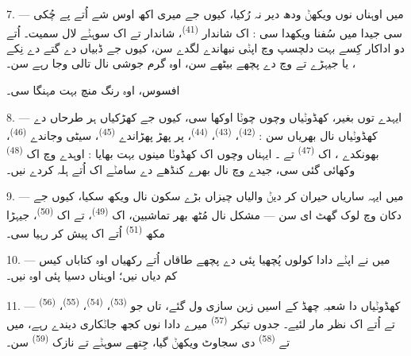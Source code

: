7. --- میں اوہناں نوں ویکھݨ ودھ دیر نہ رُکیا، کیوں جے میری اکھ اوس شے اُتے پے چُکی
سی جیدا میں سُفنا ویکھدا سی : اک شاندار 
\textsuperscript{(41)}، شاندار  تے اک سوہݨے لال  سمیت۔
 اُتے دو اداکار کِسے بہت دلچسپ  وچ اپݨی 
نبھاندے لگدے سن، کیوں جے ڈبیاں دے گتے دے نِکے ، یا جیہڑے
 تے  وچ  دے پچھے بیٹھے سن،
اوہ گرم جوشی نال تالی وجا رہے سن۔

افسوس، اوہ رنگ منچ بہت مہنگا سی۔

8. --- ایہدے توں بغیر، کھڈوݨیاں وچوں چوݨا اوکھا سی، کیوں جے کھڑکیاں ہر طرحاں دے
کھڈوݨیاں نال بھریاں سن :  \textsuperscript{(42)}،
 \textsuperscript{(43)}،  \textsuperscript{(44)}، پر
پھڑ پھڑاندے  \textsuperscript{(45)}، سیٹی وجاندے 
\textsuperscript{(46)}، بھونکدے ، اک 
\textsuperscript{(47)} تے ۔ ایہناں وچوں اک کھڈوݨا مینوں بہت بھایا :
اوہدے وچ اک  \textsuperscript{(48)} وکھائی گئی سی، جیدے وچ
 نال بھرے کنڈھے دے سامݨے  اک
 اُتے ہلہ کردے نیں۔


9. --- میں ایہہ ساریاں حیران کر دیݨ والیاں چیزاں بڑے سکون نال ویکھ سکیا، کیوں جے
دکان وچ لوک گھٹ ای سن — مشکل نال مُٹھ بھر تماشبین، اک 
\textsuperscript{(49)}، تے اک  \textsuperscript{(50)}، جیہڑا
مکھ  \textsuperscript{(51)} اُتے اک  پیش کر رہیا سی۔

10. --- میں نے اپݨے دادا کولوں پُچھیا پئی  دے پچھے طاقاں اُتے رکھیاں
اوہ کتاباں کیس کم دیاں نیں؛ اوہناں دسیا پئی اوہ  نیں۔

\VUsaut{3.6mm}
\VUsaut{2.8mm}

11. --- کھڈوݨیاں دا شعبہ چھڈ کے اسیں زین سازی ول گئے، تاں جو 
\textsuperscript{(53)}،  \textsuperscript{(54)}، 
\textsuperscript{(55)}،  \textsuperscript{(56)} تے
 اُتے اک نظر مار لئیے۔ جدوں تیکر 
\textsuperscript{(57)} میرے دادا نوں کجھ جاݨکاری دیندے رہے، میں 
تے  \textsuperscript{(58)} دی سجاوٹ ویکھݨ گیا، جِتھے سوہݨے
 تے نازک  \textsuperscript{(59)} سن۔

